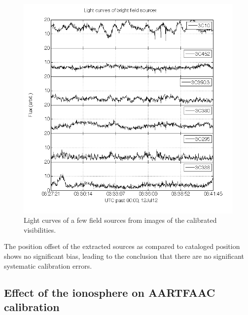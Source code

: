 \documentclass{aa}
\begin{document}
\begin{figure}[tbh]
\includegraphics[width=1\textwidth]{Figs/SB002_LBA_OUTER_SPREAD_1ch_6_convcal_7_el_fftimg_bin_save_mat_tseries}

\caption{\textcolor{red}{\label{fig:Light-curves-of}}Light curves of a few
field sources from images of the calibrated visibilities.}
\end{figure}
The position offset  of the extracted sources as  compared to cataloged position
shows  no  significant  bias,  leading  to  the conclusion  that  there  are  no
significant systematic calibration errors.


\subsection{\label{sub:iono-effect-on-calib}Effect of the ionosphere on AARTFAAC
calibration}
\end{document}
